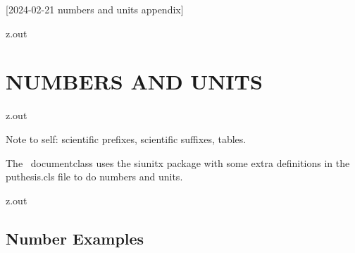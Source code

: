 [2024-02-21 numbers and units appendix]

%




\begin{VerbatimOut}{z.out}
\chapter{NUMBERS AND UNITS}
\end{VerbatimOut}

\MyIO


\begin{VerbatimOut}{z.out}

Note to self: scientific prefixes, scientific suffixes, tables.

The \PurdueThesisLogo\ documentclass
uses the siunitx \cite{wright2024} package
with some extra definitions in the puthesis.cls file
to do numbers and units.
\end{VerbatimOut}

\MyIO


\begin{VerbatimOut}{z.out}

\section{Number Examples}
\end{VerbatimOut}

\MyIO


